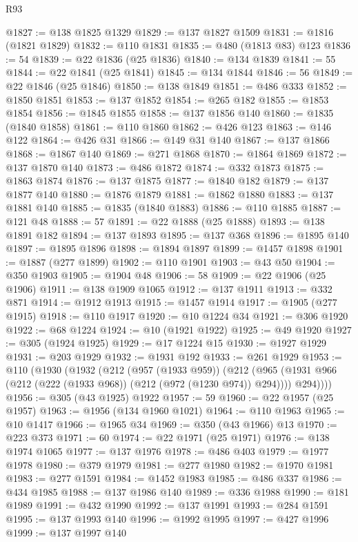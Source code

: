 \begin{lexlean}{R93}
\begin{coremodule}
@1827 := @138 @1825 @1329
@1829 := @137 @1827 @1509
@1831 := @1816 (@1821 @1829)
@1832 := @110 @1831
@1835 := @480 (@1813 @83) @123
@1836 := 54
@1839 := @22 @1836 (@25 @1836)
@1840 := @134 @1839
@1841 := 55
@1844 := @22 @1841 (@25 @1841)
@1845 := @134 @1844
@1846 := 56
@1849 := @22 @1846 (@25 @1846)
@1850 := @138 @1849
@1851 := @486 @333
@1852 := @1850 @1851
@1853 := @137 @1852
@1854 := @265 @182
@1855 := @1853 @1854
@1856 := @1845 @1855
@1858 := @137 @1856 @140
@1860 := @1835 (@1840 @1858)
@1861 := @110 @1860
@1862 := @426 @123
@1863 := @146 @122
@1864 := @426 @31
@1866 := @149 @31 @140
@1867 := @137 @1866
@1868 := @1867 @140
@1869 := @271 @1868
@1870 := @1864 @1869
@1872 := @137 @1870 @140
@1873 := @486 @1872
@1874 := @332 @1873
@1875 := @1863 @1874
@1876 := @137 @1875
@1877 := @1840 @182
@1879 := @137 @1877 @140
@1880 := @1876 @1879
@1881 := @1862 @1880
@1883 := @137 @1881 @140
@1885 := @1835 (@1840 @1883)
@1886 := @110 @1885
@1887 := @121 @48
@1888 := 57
@1891 := @22 @1888 (@25 @1888)
@1893 := @138 @1891 @182
@1894 := @137 @1893
@1895 := @137 @368
@1896 := @1895 @140
@1897 := @1895 @1896
@1898 := @1894 @1897
@1899 := @1457 @1898
@1901 := @1887 (@277 @1899)
@1902 := @110 @1901
@1903 := @43 @50
@1904 := @350 @1903
@1905 := @1904 @48
@1906 := 58
@1909 := @22 @1906 (@25 @1906)
@1911 := @138 @1909 @1065
@1912 := @137 @1911
@1913 := @332 @871
@1914 := @1912 @1913
@1915 := @1457 @1914
@1917 := @1905 (@277 @1915)
@1918 := @110 @1917
@1920 := @10 @1224 @34
@1921 := @306 @1920
@1922 := @68 @1224
@1924 := @10 (@1921 @1922)
@1925 := @49 @1920
@1927 := @305 (@1924 @1925)
@1929 := @17 @1224 @15
@1930 := @1927 @1929
@1931 := @203 @1929
@1932 := @1931 @192
@1933 := @261 @1929
@1953 := @110
    (@1930
      (@1932
        (@212
          (@957 (@1933 @959))
          (@212
            (@965 (@1931 @966 (@212 (@222 (@1933 @968)) (@212 (@972 (@1230 @974)) @294))))
            @294))))
@1956 := @305 (@43 @1925) @1922
@1957 := 59
@1960 := @22 @1957 (@25 @1957)
@1963 := @1956 (@134 @1960 @1021)
@1964 := @110 @1963
@1965 := @10 @1417
@1966 := @1965 @34
@1969 := @350 (@43 @1966) @13
@1970 := @223 @373
@1971 := 60
@1974 := @22 @1971 (@25 @1971)
@1976 := @138 @1974 @1065
@1977 := @137 @1976
@1978 := @486 @403
@1979 := @1977 @1978
@1980 := @379 @1979
@1981 := @277 @1980
@1982 := @1970 @1981
@1983 := @277 @1591
@1984 := @1452 @1983
@1985 := @486 @337
@1986 := @434 @1985
@1988 := @137 @1986 @140
@1989 := @336 @1988
@1990 := @181 @1989
@1991 := @432 @1990
@1992 := @137 @1991
@1993 := @284 @1591
@1995 := @137 @1993 @140
@1996 := @1992 @1995
@1997 := @427 @1996
@1999 := @137 @1997 @140

\end{coremodule}
\end{lexlean}

